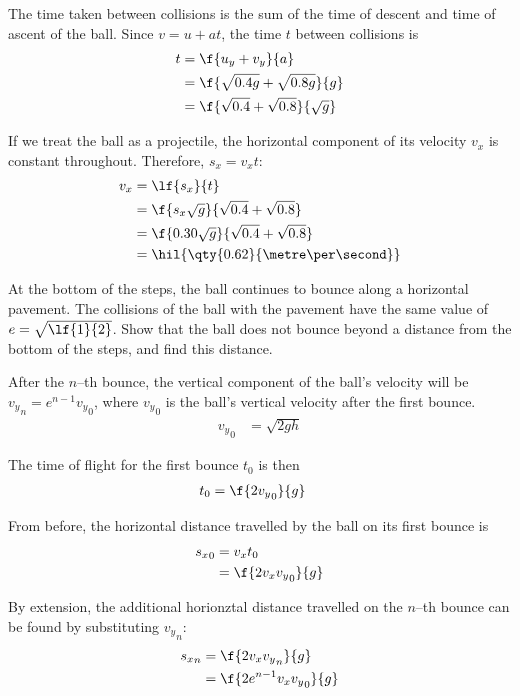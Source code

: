 The time taken between collisions is the sum of the time of descent
and time of ascent of the ball. Since \(v = u + at\), the time \(t\)
between collisions is
\begin{align*}
	t & = \f{u_y + v_y}{a}                      \\
	  & = \f{\sqrt{0.4g} + \sqrt{0.8g}}{g}      \\
	  & = \f{\sqrt{0.4} + \sqrt{0.8}}{\sqrt{g}}
\end{align*}

If we treat the ball as a projectile, the horizontal component
of its velocity \(v_x\) is constant throughout. Therefore,
\(s_x = v_xt\):
\begin{align*}
	v_x & = \lf{s_x}{t}                               \\
	    & = \f{s_x\sqrt{g}}{\sqrt{0.4} + \sqrt{0.8}}  \\
	    & = \f{0.30\sqrt{g}}{\sqrt{0.4} + \sqrt{0.8}} \\
	    & = \hil{\qty{0.62}{\metre\per\second}}
\end{align*}

\begin{problem}
At the bottom of the steps, the ball continues to bounce along a
horizontal pavement. The collisions of the ball with the pavement
have the same value of \(e = \sqrt{\lf{1}{2}}\).
Show that the ball does not bounce beyond a distance from the
bottom of the steps, and find this distance.
\end{problem}

After the \(n\)--th bounce, the vertical component of the ball's velocity
will be \({v_y}_n = e^{n-1}{v_y}_0\), where \({v_y}_0\) is the ball's vertical
velocity after the first bounce.
\begin{align*}
	{v_y}_0 & = \sqrt{2gh}
\end{align*}

The time of flight for the first bounce \(t_0\) is then
\begin{align*}
	t_0 & = \f{2{v_y}_0}{g}
\end{align*}

From before, the horizontal distance travelled by the ball on its
first bounce is
\begin{align*}
	{s_x}_0 & = v_xt_0             \\
	        & = \f{2v_x{v_y}_0}{g}
\end{align*}

By extension, the additional horionztal distance travelled on the
\(n\)--th bounce can be found by substituting \({v_y}_n\):
\begin{align*}
	{s_x}_n & = \f{2v_x{v_y}_n}{g}        \\
	        & = \f{2e^{n-1}v_x{v_y}_0}{g}
\end{align*}

